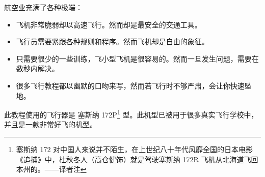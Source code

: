 \ifchinese
航空业充满了各种极端：
\begin{itemize}
\item 飞机非常脆弱却以高速飞行。然而却是最安全的交通工具。
\item 飞行员需要紧跟各种规则和程序。然而飞机却是自由的象征。
\item 只需要很少的一些训练，飞小型飞机是很容易的。然而一旦发生问题，需要在数秒内解决。
\item 很多飞行教程都以幽默的口吻来写，然而若飞行时不够严肃，会让你快速坠地。
\end{itemize}
\fi

\ifchinese
此教程使用的飞行器是 {塞斯纳 172P}\footnote{塞斯纳 172 对中国人来说并不陌生，在上世纪八十年代风靡全国的日本电影《追捕》中，杜秋冬人（高仓健饰）就是驾驶塞斯纳 172R 飞机从北海道飞回本州的。——译者注} 型。此机型已被用于很多真实飞行学校中，并且是一款非常好飞的机型。
\fi

